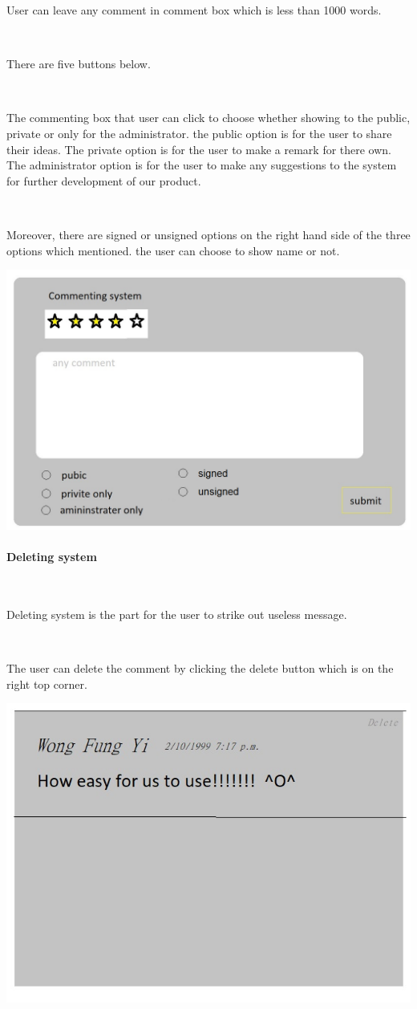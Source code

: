 User can leave any comment in comment box which is less than 1000 words.\par~

There are five buttons below.\par~

The commenting box that user can click to choose whether showing to the public, private or only for the administrator. the public option is for the user to share their ideas. The private option is for the user to make a remark for there own. The administrator option is for the user to make any suggestions to the system for further development of our product.\par~

Moreover, there are signed or unsigned options on the right hand side of the three options which mentioned. the user can choose to show name or not.

\includegraphics[scale=0.5]{Doc/Graphics/sdfg}

\paragraph{Deleting system}~

Deleting system is the part for the user to strike out useless message.\par~

The user can delete the comment by clicking the delete button which is on the right top corner.

\includegraphics[scale=0.5]{Doc/Graphics/asdf}
